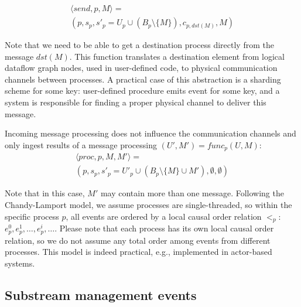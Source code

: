\begin{multline}
\langle send, p, M \rangle = \\ (p, s_p, s'_p = U_p \cup \left(B_p\setminus\{M\}\right), c_{p, dst(M)}, M)
\end{multline}

Note that we need to be able to get a destination process directly from the message $dst(M)$. This function translates a destination element from logical dataflow graph nodes, used in user-defined code, to physical communication channels between processes. A practical case of this abstraction is a sharding scheme for some key: user-defined procedure emits event for some key, and a system is responsible for finding a proper physical channel to deliver this message.

Incoming message processing does not influence the communication channels and only ingest results of a message processing $(U', M') = func_p(U, M)$:
\begin{multline}
    \langle proc, p, M, M' \rangle = \\ (p, s_p, s'_p = U'_p \cup \left(B_p \setminus \{M\} \cup M' \right) , \emptyset, \emptyset)
\end{multline}

Note that in this case, $M'$ may contain more than one message. Following the Chandy-Lamport model, we assume processes are single-threaded, so within the specific process $p$, all events are ordered by a local causal order relation $<_p$: $e^{0}_p,e^{1}_p,\ldots,e^{i}_p,\ldots$. Please note that each process has its own local causal order relation, so we do not assume any total order among events from different processes. This model is indeed practical, e.g., implemented in actor-based systems.


\subsection{Substream management events}
\label{fs-acker-substream-events}

